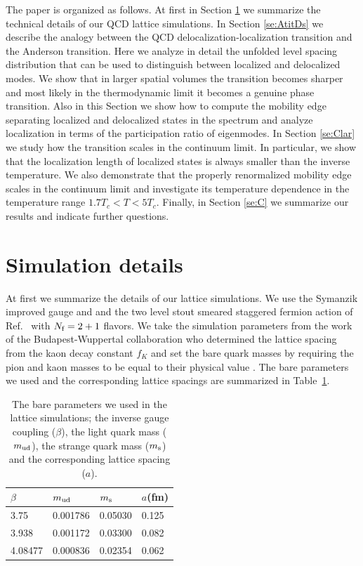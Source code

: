 \documentclass[twocolumn, prd, preprintnumbers, amsmath,
  amssymb, showpacs, floatfix]{revtex4-1}
\newcommand{\msub}[1]{\ensuremath _{\mbox{\scriptsize #1}}}
\begin{document}
The paper is organized as follows. At first in Section \ref{se:Sd} we
summarize the technical details of our QCD lattice simulations. In Section
\ref{se:AtitDs} we describe the analogy between the QCD
delocalization-localization transition and the Anderson transition. Here we
analyze in detail the unfolded level spacing distribution that can be used to
distinguish between localized and delocalized modes. We show that in larger
spatial volumes the transition becomes sharper and most likely in the
thermodynamic limit it becomes a genuine phase transition. Also in this
Section we show how to compute the mobility edge separating localized and
delocalized states in the spectrum and analyze localization in terms of the
participation ratio of eigenmodes. In Section \ref{se:Clar} we study how the
transition scales in the continuum limit. In particular, we show that the
localization length of localized states is always smaller than the inverse
temperature. We also demonstrate that the properly renormalized mobility edge
scales in the continuum limit and investigate its temperature dependence in
the temperature range $1.7T_c < T < 5 T_c$. Finally, in Section \ref{se:C} we
summarize our results and indicate further questions. 



\section{Simulation details}
    \label{se:Sd}

At first we summarize the details of our lattice simulations.  We use the
Symanzik improved gauge and and the two level stout smeared staggered fermion
action of Ref.\ \cite{Aoki:2005vt} with $N\msub{f}=2+1$ flavors.  We take the
simulation parameters from the work of the Budapest-Wuppertal collaboration
who determined the lattice spacing from the kaon decay constant $f_K$ and set
the bare quark masses by requiring the pion and kaon masses to be equal to
their physical value \cite{Borsanyi:2010cj}. The bare parameters we used and
the corresponding lattice spacings are summarized in
Table~\ref{tab:bare_parameters}.

\begin{table}
 \begin{ruledtabular}
 \begin{tabular}{llll}
   $\beta$   & $m\msub{ud}$ & $m\msub{s}$ & $a$(fm) \\ \hline
   3.75    & 0.001786     & 0.05030  & 0.125    \\
   3.938   & 0.001172     & 0.03300  & 0.082     \\  %
   4.08477 & 0.000836     & 0.02354  & 0.062     \\    
 \end{tabular}
 \end{ruledtabular}
 \caption{\label{tab:bare_parameters} The bare parameters we used in the
   lattice simulations; the inverse gauge coupling ($\beta$), the light quark
   mass ($m\msub{ud}$), the strange quark mass ($m\msub{s}$) and the
   corresponding lattice spacing ($a$).}
\end{table}
\end{document}

